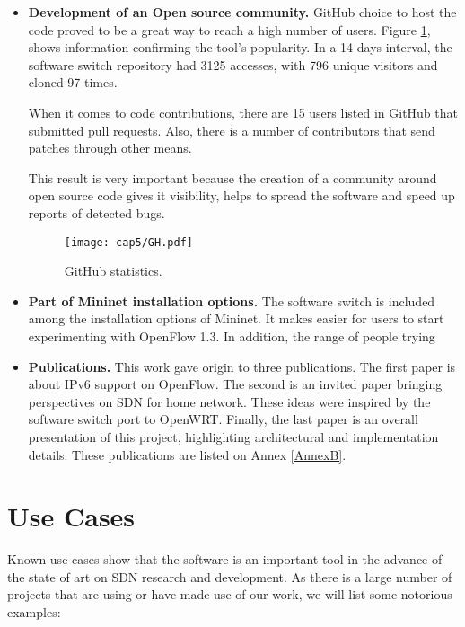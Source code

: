 \begin{itemize}
\item \textbf{Development of an Open source community.} GitHub choice to host the code proved to be a great way to reach a high number of users. Figure \ref{fig:ghstats}, shows information confirming the tool's popularity. In a 14 days interval, the software switch repository had 3125 accesses, with 796 unique visitors and cloned 97 times. 

When it comes to code contributions, there are 15 users listed in GitHub that submitted pull requests. Also, there is a number of contributors that send patches through other means.

This result is very important because the creation of a community around open source code gives it visibility, helps to spread the software and speed up reports of detected bugs. 

\begin{figure}[H]
\centering
\texttt{[image: cap5/GH.pdf]}
\caption{GitHub statistics.}
\label{fig:ghstats}
\end{figure}

\item \textbf{Part of Mininet installation options.} The software switch is included among the installation options of Mininet. It makes easier for users to start experimenting with OpenFlow 1.3. In addition, the range of people trying     

\item \textbf{Publications.} This work gave origin to three publications. The first paper is about IPv6 support on OpenFlow. The second is an invited paper bringing perspectives on SDN for home network. These ideas were inspired by the software switch port to OpenWRT. Finally, the last paper is an overall presentation of this project, highlighting architectural and implementation details. These publications are listed on Annex \ref{AnnexB}.  
\end{itemize}


\section{Use Cases}
\label{sec:cases}

Known use cases show that the software is an important tool in the advance of the state of art on SDN research and development. As there is a large number of projects that are using or have made use of our work, we will list some notorious examples: 

